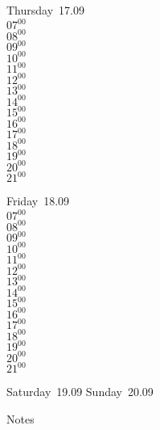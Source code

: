 \documentclass[11pt,a4paper]{book}\usepackage[]{graphicx}\usepackage[]{color}
\begin{document}
\clearpage
\begin{headerbox}
\end{headerbox}
\begin{weekdaybox}
  Thursday~17.09\\
  { 
  \vfill
  $07^{00}$\\
$08^{00}$\\
$09^{00}$\\
$10^{00}$\\
$11^{00}$\\
$12^{00}$\\
$13^{00}$\\
$14^{00}$\\
$15^{00}$\\
$16^{00}$\\
$17^{00}$\\
$18^{00}$\\
$19^{00}$\\
$20^{00}$\\
$21^{00}$\\
  }
\end{weekdaybox} 
\begin{weekdaybox}
  Friday~18.09\\
  { 
  \vfill
  $07^{00}$\\
$08^{00}$\\
$09^{00}$\\
$10^{00}$\\
$11^{00}$\\
$12^{00}$\\
$13^{00}$\\
$14^{00}$\\
$15^{00}$\\
$16^{00}$\\
$17^{00}$\\
$18^{00}$\\
$19^{00}$\\
$20^{00}$\\
$21^{00}$\\
  }
\end{weekdaybox}
\begin{weekendbox}
  Saturday~19.09
  \tcblower
  Sunday~20.09
\end{weekendbox} %
\begin{notebox}
  Notes
\end{notebox}
\clearpage
\end{document}
